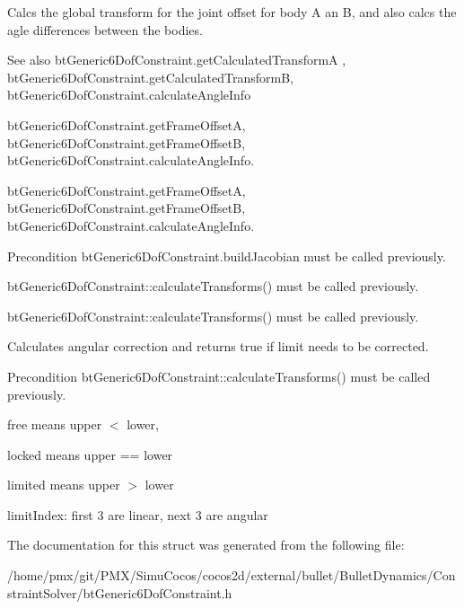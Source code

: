 Calcs the global transform for the joint offset for body A an B, and also calcs the agle differences between the bodies. \begin{DoxySeeAlso}{See also}
bt\+Generic6\+Dof\+Constraint.\+get\+Calculated\+TransformA , bt\+Generic6\+Dof\+Constraint.\+get\+Calculated\+TransformB, bt\+Generic6\+Dof\+Constraint.\+calculate\+Angle\+Info

bt\+Generic6\+Dof\+Constraint.\+get\+Frame\+OffsetA, bt\+Generic6\+Dof\+Constraint.\+get\+Frame\+OffsetB, bt\+Generic6\+Dof\+Constraint.\+calculate\+Angle\+Info.

bt\+Generic6\+Dof\+Constraint.\+get\+Frame\+OffsetA, bt\+Generic6\+Dof\+Constraint.\+get\+Frame\+OffsetB, bt\+Generic6\+Dof\+Constraint.\+calculate\+Angle\+Info.
\end{DoxySeeAlso}
\begin{DoxyPrecond}{Precondition}
bt\+Generic6\+Dof\+Constraint.\+build\+Jacobian must be called previously.

bt\+Generic6\+Dof\+Constraint\+::calculate\+Transforms() must be called previously.

bt\+Generic6\+Dof\+Constraint\+::calculate\+Transforms() must be called previously.
\end{DoxyPrecond}
Calculates angular correction and returns true if limit needs to be corrected. \begin{DoxyPrecond}{Precondition}
bt\+Generic6\+Dof\+Constraint\+::calculate\+Transforms() must be called previously.
\end{DoxyPrecond}

\begin{DoxyItemize}
\item free means upper $<$ lower,
\item locked means upper == lower
\item limited means upper $>$ lower
\item limit\+Index\+: first 3 are linear, next 3 are angular 
\end{DoxyItemize}

The documentation for this struct was generated from the following file\+:\begin{DoxyCompactItemize}
\item 
/home/pmx/git/\+P\+M\+X/\+Simu\+Cocos/cocos2d/external/bullet/\+Bullet\+Dynamics/\+Constraint\+Solver/bt\+Generic6\+Dof\+Constraint.\+h\end{DoxyCompactItemize}
